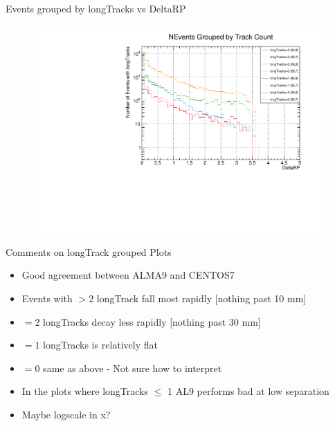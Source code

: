 \begin{frame}{Events grouped by longTracks vs DeltaRP}
    \begin{figure}
        \includegraphics[width=\linewidth]{./output/Effi_DeltaRP_all.pdf}
    \end{figure}
\end{frame}

\begin{frame}{Comments on longTrack grouped Plots}
    \begin{itemize}
        \item Good agreement between ALMA9 and CENTOS7
        \item Events with $>2$ longTrack fall most rapidly [nothing past 10 mm]
        \item $=2$ longTracks decay less rapidly [nothing past 30 mm]
        \item $=1$ longTracks is relatively flat
        \item $=0$ same as above - Not sure how to interpret
        \item In the plots where longTracks $\leq$ 1 AL9 performs bad at low separation 
        \item Maybe logscale in x?
    \end{itemize}
    
\end{frame}